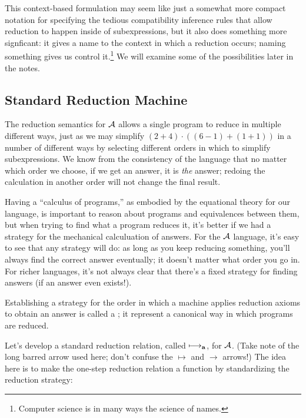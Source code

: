 This context-based formulation may seem like just a somewhat more
compact notation for specifying the tedious compatibility inference
rules that allow reduction to happen inside of subexpressions, but it
also does something more signficant: it gives a name to the context in
which a reduction occurs; naming something gives us control
it.\footnote{Computer science is in many ways the science of names.}
We will examine some of the possibilities later in the notes.


\subsection{Standard Reduction Machine}

The reduction semantics for $\mathcal{A}$ allows a single program to reduce
in multiple different ways, just as we may simplify
$(2+4)\cdot((6-1)+(1+1))$ in a number of different ways by selecting
different orders in which to simplify subexpressions. We know from the
consistency of the language that no matter which order we choose, if
we get an answer, it is \emph{the} answer; redoing the calculation in
another order will not change the final result.

Having a ``calculus of programs,'' as embodied by the equational
theory for our language, is important to reason about programs and
equivalences between them, but when trying to find what a program
reduces it, it's better if we had a strategy for the mechanical
calculuation of answers.  For the $\mathcal{A}$ language, it's easy to see
that any strategy will do: as long as you keep reducing something,
you'll always find the correct answer eventually; it doesn't matter
what order you go in.  For richer languages, it's not always clear
that there's a fixed strategy for finding answers (if an answer even
exists!).


Establishing a strategy for the order in which a machine applies
reduction axioms to obtain an answer is called a ; it represent a canonical way in which programs
are reduced.




Let's develop a standard reduction relation, called $\longmapsto_{\mathop{\mathbf{a}}}$, for
$\mathcal{A}$.  (Take note of the long barred arrow used here; don't
confuse the $\longmapsto$ and $\rightarrow$ arrows!) The idea here is
to make the one-step reduction relation a function by standardizing
the reduction strategy:

